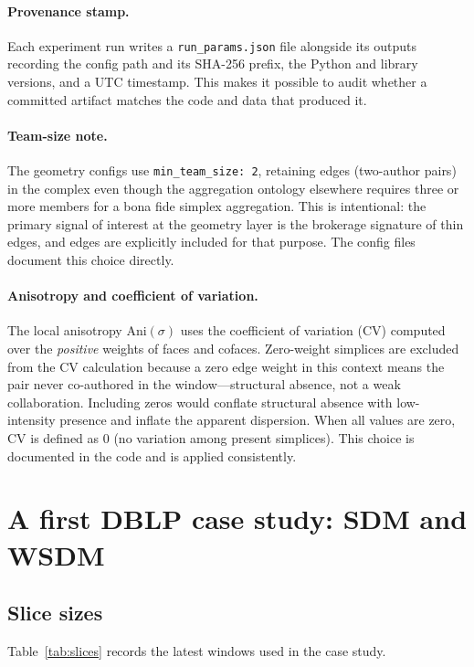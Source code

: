 \documentclass[11pt]{article}
\begin{document}
\paragraph{Provenance stamp.}
Each experiment run writes a \texttt{run\_params.json} file alongside its outputs recording the config path and its SHA-256 prefix, the Python and library versions, and a UTC timestamp. This makes it possible to audit whether a committed artifact matches the code and data that produced it.

\paragraph{Team-size note.}
The geometry configs use \texttt{min\_team\_size: 2}, retaining edges (two-author pairs) in the complex even though the aggregation ontology elsewhere requires three or more members for a bona fide simplex aggregation. This is intentional: the primary signal of interest at the geometry layer is the brokerage signature of thin edges, and edges are explicitly included for that purpose. The config files document this choice directly.

\paragraph{Anisotropy and coefficient of variation.}
The local anisotropy $\mathrm{Ani}(\sigma)$ uses the coefficient of variation (CV) computed over the \emph{positive} weights of faces and cofaces. Zero-weight simplices are excluded from the CV calculation because a zero edge weight in this context means the pair never co-authored in the window---structural absence, not a weak collaboration. Including zeros would conflate structural absence with low-intensity presence and inflate the apparent dispersion. When all values are zero, CV is defined as $0$ (no variation among present simplices). This choice is documented in the code and is applied consistently.

\section{A first DBLP case study: SDM and WSDM}

\subsection{Slice sizes}

Table~\ref{tab:slices} records the latest windows used in the case study.
\end{document}

